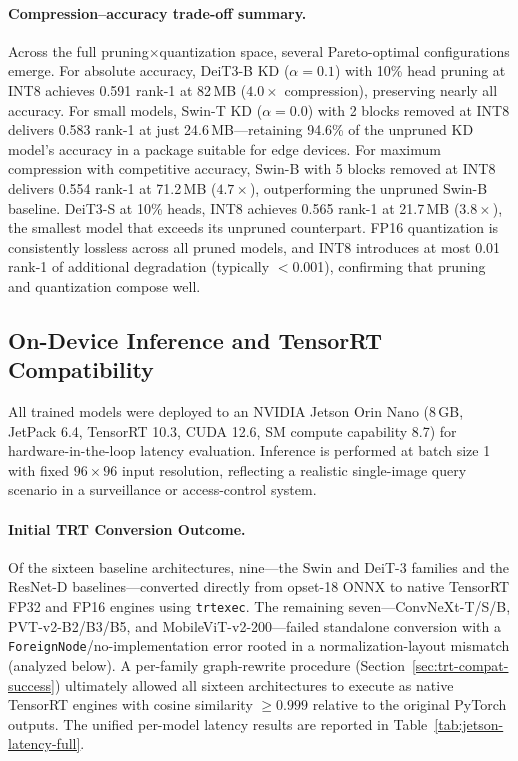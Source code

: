 \documentclass[runningheads,a4paper]{llncs}
\begin{document}
\paragraph{Compression--accuracy trade-off summary.}
Across the full pruning$\times$quantization space, several Pareto-optimal configurations emerge. For absolute accuracy, DeiT3-B KD ($\alpha{=}0.1$) with 10\% head pruning at INT8 achieves 0.591 rank-1 at 82\,MB ($4.0\times$ compression), preserving nearly all accuracy. For small models, Swin-T KD ($\alpha{=}0.0$) with 2 blocks removed at INT8 delivers 0.583 rank-1 at just 24.6\,MB---retaining 94.6\% of the unpruned KD model's accuracy in a package suitable for edge devices. For maximum compression with competitive accuracy, Swin-B with 5 blocks removed at INT8 delivers 0.554 rank-1 at 71.2\,MB ($4.7\times$), outperforming the unpruned Swin-B baseline. DeiT3-S at 10\% heads, INT8 achieves 0.565 rank-1 at 21.7\,MB ($3.8\times$), the smallest model that exceeds its unpruned counterpart. FP16 quantization is consistently lossless across all pruned models, and INT8 introduces at most 0.01 rank-1 of additional degradation (typically $<$0.001), confirming that pruning and quantization compose well.

\subsection{On-Device Inference and TensorRT Compatibility}\label{sec:trt-compat}

All trained models were deployed to an NVIDIA Jetson Orin Nano (8\,GB, JetPack 6.4, TensorRT 10.3, CUDA 12.6, SM compute capability 8.7) for hardware-in-the-loop latency evaluation. Inference is performed at batch size 1 with fixed $96\times96$ input resolution, reflecting a realistic single-image query scenario in a surveillance or access-control system.

\paragraph{Initial TRT Conversion Outcome.}
Of the sixteen baseline architectures, nine---the Swin and DeiT-3 families and the ResNet-D baselines---converted directly from opset-18 ONNX to native TensorRT FP32 and FP16 engines using \texttt{trtexec}. The remaining seven---ConvNeXt-T/S/B, PVT-v2-B2/B3/B5, and MobileViT-v2-200---failed standalone conversion with a \texttt{ForeignNode}/no-implementation error rooted in a normalization-layout mismatch (analyzed below). A per-family graph-rewrite procedure (Section~\ref{sec:trt-compat-success}) ultimately allowed all sixteen architectures to execute as native TensorRT engines with cosine similarity $\geq 0.999$ relative to the original PyTorch outputs. The unified per-model latency results are reported in Table~\ref{tab:jetson-latency-full}.
\end{document}
